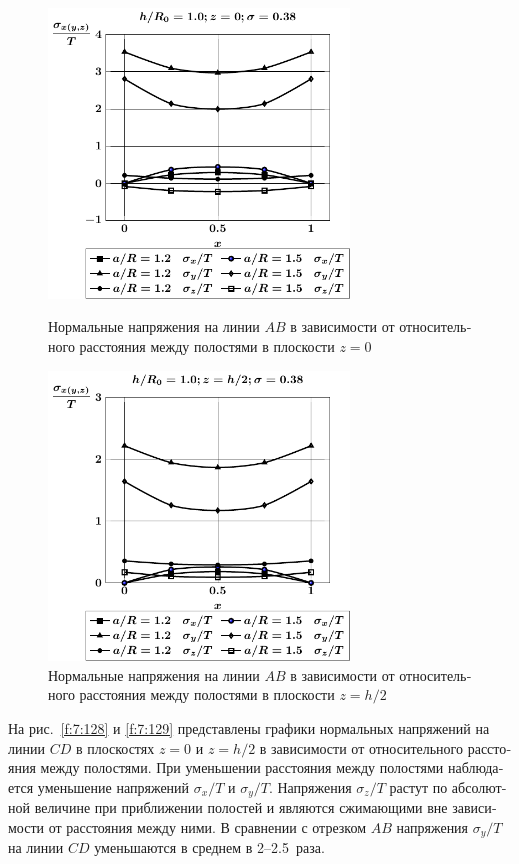 \begin{russian}
\begin{figure}[h!]
\centering\footnotesize
\parbox[b]{7.5cm}{\centering\includegraphics[width=8cm]{cav24-a-h10-r10-z0.pdf}
\caption{Нормальные напряжения на линии $AB$ в зависимости от относительного расстояния между полостями в плоскости $z=0$
\label{f:7:126}}}\hfil\hfil
\parbox[b]{7.5cm}{\centering\includegraphics[width=8cm]{cav24-a-h10-r10-z1.pdf}
\caption{Нормальные напряжения на линии $AB$ в зависимости от относительного расстояния между полостями в плоскости $z=h/2$
\label{f:7:127}}}
\end{figure}

На рис.~\ref{f:7:128} и \ref{f:7:129} представлены графики нормальных напряжений на линии $CD$ в плоскостях $z=0$ и $z=h/2$ в зависимости от относительного расстояния между полостями. При уменьшении расстояния между полостями наблюдается уменьшение напряжений $\sigma_x/T$ и $\sigma_y/T$. Напряжения $\sigma_z/T$ растут по абсолютной величине при приближении полостей и являются сжимающими вне зависимости от расстояния между ними. В сравнении с отрезком $AB$ напряжения $\sigma_y/T$ на линии $CD$ уменьшаются в среднем в 2--2.5~раза.


\end{russian}
